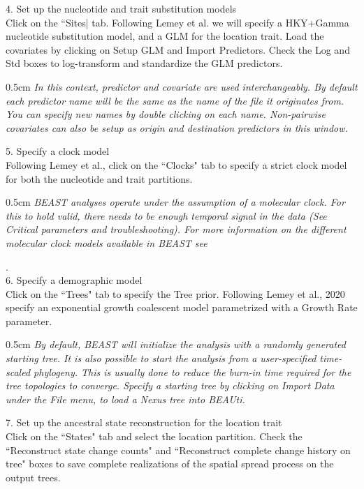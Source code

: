 \documentclass{article}
\newcommand{\ann}[1]{
\begin{adjustwidth}{0.5cm}{}
\it{#1}\\
\end{adjustwidth}}
\newcommand{\code}[1]{
{\upshape\ttfamily{#1}}}
\begin{document}
4. Set up the nucleotide and trait substitution models\\

Click on the ``Sites| tab. Following Lemey et al. we will specify a HKY+Gamma nucleotide substitution model, and a GLM for the location trait. Load the covariates by clicking on Setup GLM and Import Predictors. Check the Log and Std boxes to log-transform and standardize the GLM predictors.\\

\ann{In this context, predictor and covariate are used interchangeably. By default each predictor name will be the same as the name of the file it originates from. You can specify new names by double clicking on each name. Non-pairwise covariates can also be setup as origin and destination predictors in this window.}

5. Specify a clock model\\

Following Lemey et al., click on the ``Clocks" tab to specify a strict clock model for both the nucleotide and trait partitions.\\

\ann{BEAST analyses operate under the assumption of a molecular clock. For this to hold valid, there needs to be enough temporal signal in the data (See Critical parameters and troubleshooting). For more information on the different molecular clock models available in BEAST see \code{http://beast.community/clocks}}.\\

6. Specify a demographic model\\

Click on the ``Trees" tab to specify the Tree prior. Following Lemey et al., 2020 specify an exponential growth coalescent model parametrized with a Growth Rate parameter. \\

\ann{By default, BEAST will initialize the analysis with a randomly generated starting tree. It is also possible to start the analysis from a user-specified time-scaled phylogeny. This is usually done to reduce the burn-in time required for the tree topologies to converge. Specify a starting tree by clicking on Import Data under the File menu, to load a Nexus tree into BEAUti.}

7. Set up the ancestral state reconstruction for the location trait\\

Click on the ``States" tab and select the location partition. Check the ``Reconstruct state change counts" and ``Reconstruct complete change history on tree" boxes to save complete realizations of the spatial spread process on the output trees.\\
\end{document}
